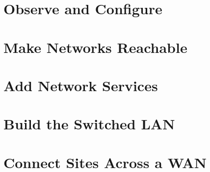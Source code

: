 \documentclass[11pt,oneside,a4paper]{report}
\begin{document}
\utpfrontmatter

\renewcommand{\thechapter}{1A}
\renewcommand{\theHchapter}{setup.1A}


\renewcommand{\thechapter}{1B}
\renewcommand{\theHchapter}{setup.1B}


\setcounter{chapter}{1}
\renewcommand{\thechapter}{\arabic{chapter}}
\renewcommand{\theHchapter}{\arabic{chapter}}

\part{Observe and Configure}




\part{Make Networks Reachable}



\part{Add Network Services}



\part{Build the Switched LAN}



\part{Connect Sites Across a WAN}




\end{document}
